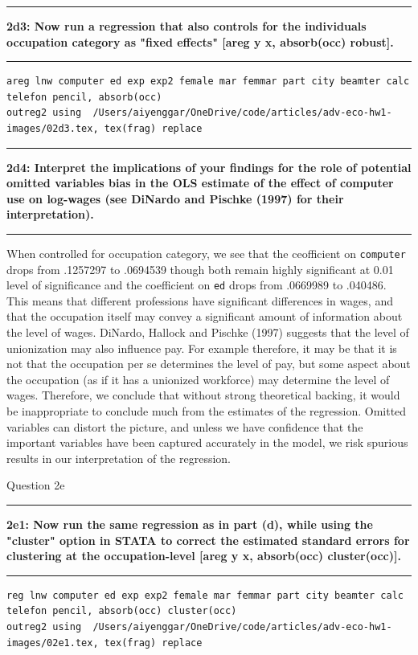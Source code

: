 \documentclass[12pt]{article}
\newcommand\question[2]{\vspace{1em}\hrule\vspace{1em}\textbf{#1: #2}\vspace{1em}\hrule\vspace{1em}}
\begin{document}
\question{2d3}{Now run a regression that also controls for the individual\textquotesingle s occupation category as "fixed effects" [areg y x, absorb(occ) robust].  }
\begin{lstlisting}
areg lnw computer ed exp exp2 female mar femmar part city beamter calc telefon pencil, absorb(occ)
outreg2 using  /Users/aiyenggar/OneDrive/code/articles/adv-eco-hw1-images/02d3.tex, tex(frag) replace
\end{lstlisting}


\question{2d4}{Interpret the implications of your findings for the role of potential omitted variables bias in the OLS estimate of the effect of computer use on log-wages (see DiNardo and Pischke (1997) for their interpretation).}
When controlled for occupation category,  we see that the ceofficient on \verb|computer| drops from .1257297 to .0694539 though both remain highly significant at 0.01 level of significance and the coefficient on \verb|ed| drops from .0669989  to .040486. This means that different professions have significant differences in wages, and that the occupation itself may convey a significant amount of information about the level of wages. DiNardo, Hallock and Pischke (1997) suggests that the level of unionization may also influence pay. For example therefore, it may be that it is not that the occupation per se determines the level of pay, but some aspect about the occupation (as if it has a unionized workforce) may determine the level of wages. Therefore, we conclude that without strong theoretical backing, it would be inappropriate to conclude much from the estimates of the regression. Omitted variables can distort the picture, and unless we have confidence that the important variables have been captured accurately in the model, we risk spurious results in our interpretation of the regression.

\begin{center}\LARGE{Question 2e}\end{center}

\question{2e1}{Now run the same regression as in part (d), while using the "cluster" option in STATA to correct the estimated standard errors for clustering at the occupation-level [areg y x, absorb(occ) cluster(occ)].  }
\begin{lstlisting}
reg lnw computer ed exp exp2 female mar femmar part city beamter calc telefon pencil, absorb(occ) cluster(occ)
outreg2 using  /Users/aiyenggar/OneDrive/code/articles/adv-eco-hw1-images/02e1.tex, tex(frag) replace
\end{lstlisting}

\end{document}
